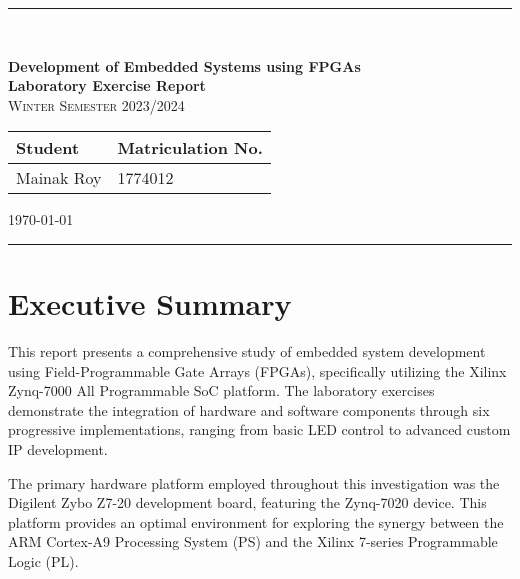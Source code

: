 \documentclass[11pt,a4paper]{article}
\begin{document}
\begin{titlepage}
    \centering
    
    \vspace{-6em}
    {\color{esablue}\rule{4cm}{0.5pt}}\\
    \vspace{2cm}
    
    {\Huge\textbf{\color{esablue}Development of Embedded Systems using FPGAs}}\\
    \vspace{0.5cm}
    {\LARGE\textbf{\color{esagray}Laboratory Exercise Report}}\\
    \vspace{1cm}
    {\large\textsc{Winter Semester 2023/2024}}\\
    \vspace{3cm}
    
    \begin{tabular}{@{}ll@{}}
        \toprule
        \textbf{Student} & \textbf{Matriculation No.} \\
        \midrule
        Mainak Roy & 1774012 \\
        \bottomrule
    \end{tabular}
    
    \vfill
    
    {\color{esagray}\large\today}\\
    \vspace{1cm}
    {\color{esablue}\rule{4cm}{0.5pt}}
\end{titlepage}

\newpage
\tableofcontents
\newpage

\listoffigures
\newpage

\section{Executive Summary}

This report presents a comprehensive study of embedded system development using Field-Programmable Gate Arrays (FPGAs), specifically utilizing the Xilinx Zynq-7000 All Programmable SoC platform. The laboratory exercises demonstrate the integration of hardware and software components through six progressive implementations, ranging from basic LED control to advanced custom IP development.

The primary hardware platform employed throughout this investigation was the Digilent Zybo Z7-20 development board, featuring the Zynq-7020 device. This platform provides an optimal environment for exploring the synergy between the ARM Cortex-A9 Processing System (PS) and the Xilinx 7-series Programmable Logic (PL).
\end{document}
